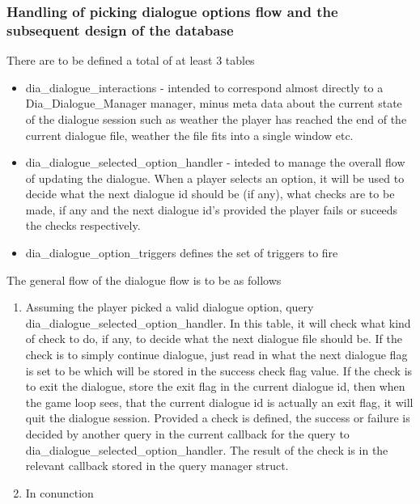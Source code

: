 \documentclass{report}
\begin{document}
\subsubsection*{Handling of picking dialogue options flow and the subsequent design of the database}
There are to be defined a total of at least 3 tables 

\begin{itemize}
\item dia\_dialogue\_interactions - intended to correspond almost directly to a Dia\_Dialogue\_Manager manager, minus meta data about the current state of the dialogue session such as weather the player has reached the end of the current dialogue file, weather the file fits into a single window etc.

\item dia\_dialogue\_selected\_option\_handler - inteded to manage the overall flow of updating the dialogue. When a player selects an option, it will be used to decide what the next dialogue id should be (if any), what checks are to be made, if any and the next dialogue id's provided the player fails or suceeds the checks respectively.

\item dia\_dialogue\_option\_triggers defines the set of triggers to fire 
\end{itemize}

The general flow of the dialogue flow is to be as follows

\begin{enumerate}
\item Assuming the player picked a valid dialogue option, query dia\_dialogue\_selected\_option\_handler. In this table, it will check what kind of check to do, if any, to decide what the next dialogue file should be. If the check is to simply continue dialogue, just read in what the next dialogue flag is set to be which will be stored in the success check flag value. If the check is to exit the dialogue, store the exit flag in the current dialogue id, then when the game loop sees, that the current dialogue id is actually an exit flag, it will quit the dialogue session. Provided a check is defined, the success or failure is decided by another query in the current callback for the query to dia\_dialogue\_selected\_option\_handler. The result of the check is in the relevant callback stored in the query manager struct. 

\item In conunction
\end{enumerate}
\end{document}
